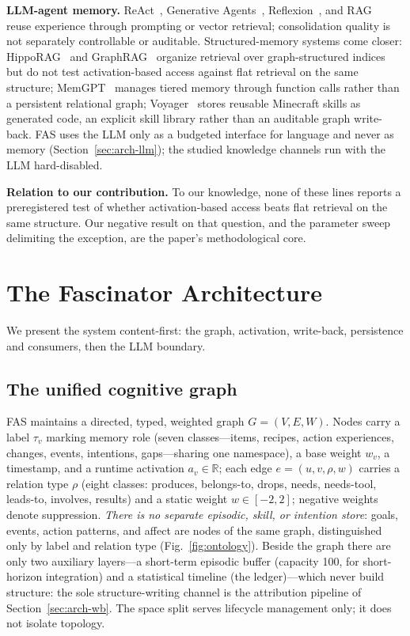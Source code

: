 \documentclass[10pt,a4paper]{article}
\begin{document}
\textbf{LLM-agent memory.} ReAct~\citep{yao2023react}, Generative Agents~\citep{park2023generative}, Reflexion~\citep{shinn2023reflexion}, and RAG~\citep{lewis2020rag} reuse experience through prompting or vector retrieval; consolidation quality is not separately controllable or auditable. Structured-memory systems come closer: HippoRAG~\citep{gutierrez2024hipporag} and GraphRAG~\citep{edge2024graphrag} organize retrieval over graph-structured indices but do not test activation-based access against flat retrieval on the same structure; MemGPT~\citep{packer2023memgpt} manages tiered memory through function calls rather than a persistent relational graph; Voyager~\citep{wang2023voyager} stores reusable Minecraft skills as generated code, an explicit skill library rather than an auditable graph write-back. FAS uses the LLM only as a budgeted interface for language and never as memory (Section~\ref{sec:arch-llm}); the studied knowledge channels run with the LLM hard-disabled.

\textbf{Relation to our contribution.} To our knowledge, none of these lines reports a preregistered test of whether activation-based access beats flat retrieval on the same structure. Our negative result on that question, and the parameter sweep delimiting the exception, are the paper's methodological core.

\section{The Fascinator Architecture}
\label{sec:arch}

We present the system content-first: the graph, activation, write-back, persistence and consumers, then the LLM boundary.

\subsection{The unified cognitive graph}
\label{sec:arch-graph}
FAS maintains a directed, typed, weighted graph $G=(V,E,W)$. Nodes carry a label $\tau_v$ marking memory role (seven classes---items, recipes, action experiences, changes, events, intentions, gaps---sharing one namespace), a base weight $w_v$, a timestamp, and a runtime activation $a_v\in\mathbb{R}$; each edge $e=(u,v,\rho,w)$ carries a relation type $\rho$ (eight classes: produces, belongs-to, drops, needs, needs-tool, leads-to, involves, results) and a static weight $w\in[-2,2]$; negative weights denote suppression. \emph{There is no separate episodic, skill, or intention store}: goals, events, action patterns, and affect are nodes of the same graph, distinguished only by label and relation type (Fig.~\ref{fig:ontology}). Beside the graph there are only two auxiliary layers---a short-term episodic buffer (capacity 100, for short-horizon integration) and a statistical timeline (the ledger)---which never build structure: the sole structure-writing channel is the attribution pipeline of Section~\ref{sec:arch-wb}. The space split serves lifecycle management only; it does not isolate topology.
\end{document}
